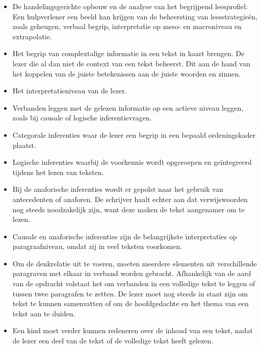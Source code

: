\begin{itemize}
	\item De handelingsgerichte opbouw en de analyse van het begrijpend leesprofiel: Een hulpverlener een beeld kan krijgen van de beheersting van leesstrategieën, zoals geheugen, verbaal begrip, interpretatie op meso- en macroniveau en extrapolatie.
	\item Het begrip van complextalige informatie in een tekst in kaart brengen. De lezer die al dan niet de context van een tekst beheerst. Dit aan de hand van het koppelen van de juiste betekenissen aan de juiste woorden en zinnen.
	\item Het interpretatieniveau van de lezer.
	\item Verbanden leggen met de gelezen informatie op een actieve niveau leggen, zoals bij causale of logische inferentievragen. 
	\item Categorale inferenties waar de lezer een begrip in een bepaald ordeningskader plaatst.
	\item Logische inferenties waarbij de voorkennis wordt opgeroepen en geïntegreerd tijdens het lezen van teksten. 
	\item Bij de anaforische inferenties wordt er gepolst naar het gebruik van antecedenten of anaforen. De schrijver haalt echter aan dat verwijswoorden nog steeds noodzakelijk zijn, want deze maken de tekst aangenamer om te lezen.
	\item Causale en anaforische inferenties zijn de belangrijkste interpretaties op paragraafniveau, omdat zij in veel teksten voorkomen.
	\item Om de denkrelatie uit te voeren, moeten meerdere elementen uit verschillende paragraven met elkaar in verband worden gebracht. Afhankelijk van de aard van de opdracht volstaat het om verbanden in een volledige tekst te leggen of tussen twee paragrafen te zetten. De lezer moet nog steeds in staat zijn om tekst te kunnen samenvatten of om de hoofdgedachte en het thema van een tekst aan te duiden.
	\item Een kind moet verder kunnen redeneren over de inhoud van een tekst, nadat de lezer een deel van de tekst of de volledige tekst heeft gelezen. 
\end{itemize}

